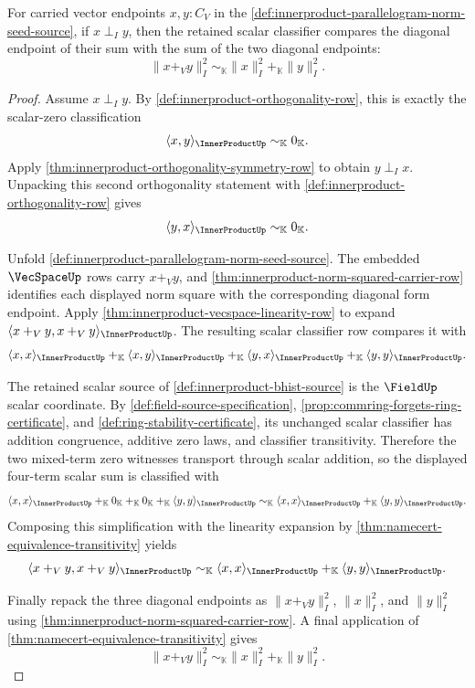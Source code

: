 \begin{theorem}
\label{thm:innerproduct-pythagorean-row}
For carried vector endpoints $x,y:C_V$ in the
\autoref{def:innerproduct-parallelogram-norm-seed-source}, if $x\perp_I y$,
then the retained scalar classifier compares the diagonal endpoint of their
sum with the sum of the two diagonal endpoints:
$$
\|x+_V y\|_{I}^{2}
\sim_{\mathbb{K}}
\|x\|_{I}^{2}+_{\mathbb{K}}\|y\|_{I}^{2}.
$$
\end{theorem}
\begin{proof}
Assume $x\perp_I y$. By \autoref{def:innerproduct-orthogonality-row}, this is
exactly the scalar-zero classification
$$
\langle x,y\rangle_{\InnerProductUp}\sim_{\mathbb{K}}0_{\mathbb{K}}.
$$
Apply \autoref{thm:innerproduct-orthogonality-symmetry-row} to obtain
$y\perp_I x$. Unpacking this second orthogonality statement with
\autoref{def:innerproduct-orthogonality-row} gives
$$
\langle y,x\rangle_{\InnerProductUp}\sim_{\mathbb{K}}0_{\mathbb{K}}.
$$

Unfold \autoref{def:innerproduct-parallelogram-norm-seed-source}. The
embedded $\VecSpaceUp$ rows carry $x+_V y$, and
\autoref{thm:innerproduct-norm-squared-carrier-row} identifies each displayed
norm square with the corresponding diagonal form endpoint. Apply
\autoref{thm:innerproduct-vecspace-linearity-row} to expand
$\langle x+_V y,x+_V y\rangle_{\InnerProductUp}$. The resulting scalar
classifier row compares it with
$$
\langle x,x\rangle_{\InnerProductUp}
+_{\mathbb{K}}
\langle x,y\rangle_{\InnerProductUp}
+_{\mathbb{K}}
\langle y,x\rangle_{\InnerProductUp}
+_{\mathbb{K}}
\langle y,y\rangle_{\InnerProductUp}.
$$

The retained scalar source of \autoref{def:innerproduct-bhist-source} is the
$\FieldUp$ scalar coordinate. By \autoref{def:field-source-specification},
\autoref{prop:commring-forgets-ring-certificate}, and
\autoref{def:ring-stability-certificate}, its unchanged scalar classifier has
addition congruence, additive zero laws, and classifier transitivity.
Therefore the two mixed-term zero witnesses transport through scalar addition,
so the displayed four-term scalar sum is classified with
$$
\langle x,x\rangle_{\InnerProductUp}
+_{\mathbb{K}}
0_{\mathbb{K}}
+_{\mathbb{K}}
0_{\mathbb{K}}
+_{\mathbb{K}}
\langle y,y\rangle_{\InnerProductUp}
\sim_{\mathbb{K}}
\langle x,x\rangle_{\InnerProductUp}
+_{\mathbb{K}}
\langle y,y\rangle_{\InnerProductUp}.
$$
Composing this simplification with the linearity expansion by
\autoref{thm:namecert-equivalence-transitivity} yields
$$
\langle x+_V y,x+_V y\rangle_{\InnerProductUp}
\sim_{\mathbb{K}}
\langle x,x\rangle_{\InnerProductUp}
+_{\mathbb{K}}
\langle y,y\rangle_{\InnerProductUp}.
$$

Finally repack the three diagonal endpoints as
$\|x+_V y\|_{I}^{2}$, $\|x\|_{I}^{2}$, and $\|y\|_{I}^{2}$ using
\autoref{thm:innerproduct-norm-squared-carrier-row}. A final application of
\autoref{thm:namecert-equivalence-transitivity} gives
$$
\|x+_V y\|_{I}^{2}
\sim_{\mathbb{K}}
\|x\|_{I}^{2}+_{\mathbb{K}}\|y\|_{I}^{2}.
$$
\end{proof}

